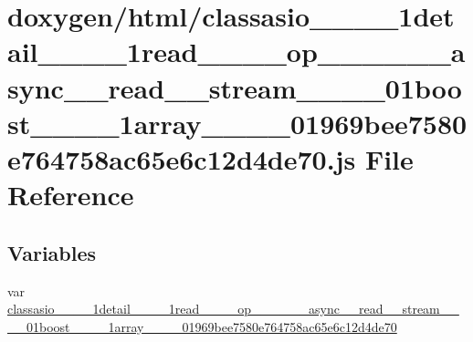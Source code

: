 \hypertarget{classasio____1____1detail____1____1read________op____3____01____async____read____stream____00___8d6cfe2a04d22f2e6a0ed0babcc6699b}{}\section{doxygen/html/classasio\+\_\+\+\_\+\_\+\+\_\+1detail\+\_\+\+\_\+\_\+\+\_\+1read\+\_\+\+\_\+\+\_\+\+\_\+op\+\_\+\+\_\+\_\+\+\_\+\_\+\+\_\+async\+\_\+\+\_\+read\+\_\+\+\_\+stream\+\_\+\+\_\+\_\+\+\_\+01boost\+\_\+\+\_\+\_\+\+\_\+1array\+\_\+\+\_\+\_\+\+\_\+01969bee7580e764758ac65e6c12d4de70.js File Reference}
\label{classasio____1____1detail____1____1read________op____3____01____async____read____stream____00___8d6cfe2a04d22f2e6a0ed0babcc6699b}
\subsection*{Variables}
\begin{DoxyCompactItemize}
\item 
var \hyperlink{classasio____1____1detail____1____1read________op____3____01____async____read____stream____00___8d6cfe2a04d22f2e6a0ed0babcc6699b_a99336d596eaeb1d6b72329b77f0e7b6d}{classasio\+\_\+\+\_\+\_\+\+\_\+1detail\+\_\+\+\_\+\_\+\+\_\+1read\+\_\+\+\_\+\+\_\+\+\_\+op\+\_\+\+\_\+\_\+\+\_\+\_\+\+\_\+async\+\_\+\+\_\+read\+\_\+\+\_\+stream\+\_\+\+\_\+\_\+\+\_\+01boost\+\_\+\+\_\+\_\+\+\_\+1array\+\_\+\+\_\+\_\+\+\_\+01969bee7580e764758ac65e6c12d4de70}
\end{DoxyCompactItemize}


